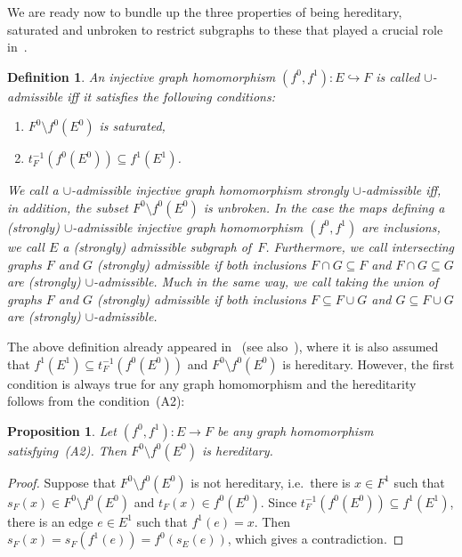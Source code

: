 \documentclass[12pt,times,a4paper]{amsart}
\newtheorem{proposition}[theorem]{Proposition}
\newtheorem{definition}[theorem]{Definition}
\numberwithin{equation}{section}
\numberwithin{equation}{section}
\begin{document}
We are ready now to bundle up the three properties of being hereditary, saturated and unbroken
to restrict subgraphs to these that played a crucial role in~\cite{hrt20}.
\begin{definition}\label{admissiblesubgraph}
An injective graph homomorphism $(f^0,f^1):E\hookrightarrow F$ is called $\cup$-{\em admissible} iff
 it satisfies the following conditions:
\begin{enumerate}
\item[{\rm (A1)}] $F^0\setminus f^0(E^0)$ is saturated,
\item[{\rm (A2)}] $t^{-1}_F(f^0(E^0))\subseteq f^1(E^1)$.
\end{enumerate}
We call a $\cup$-admissible injective graph homomorphism
 \emph{strongly $\cup$-admissible} iff, in addition, the subset $F^0\setminus f^0(E^0)$ is unbroken.
In the case the maps defining a (strongly) $\cup$-admissible injective graph homomorphism $(f^0,f^1)$ are inclusions, 
we call $E$ a {\em (strongly) admissible subgraph} of~$F$.
Furthermore, we call intersecting  graphs $F$ and $G$ (strongly) admissible if both inclusions $F\cap G\subseteq F$ 
and $F\cap G\subseteq G$ are (strongly) $\cup$-admissible. Much in the same way, we call taking the union of graphs $F$ and $G$ 
(strongly) admissible if both inclusions $F\subseteq F\cup G$ 
and $G\subseteq F\cup G$ are (strongly) $\cup$-admissible. 
\end{definition}
\noindent
The above definition already appeared in~\cite[Definition~3.1]{cht21} (see also~\cite[Definition~2.1]{hrt20}), where it is also 
assumed that $f^1(E^1)\subseteq t^{-1}_F(f^0(E^0))$ and $F^0\setminus f^0(E^0)$ is hereditary. However, the 
first condition is always true for any graph homomorphism and the hereditarity follows from 
the condition~(A2):
\begin{proposition}\label{hermorph}
Let $(f^0,f^1):E\to F$ be any graph homomorphism satisfying~(A2). Then $F^0\setminus f^0(E^0)$ is hereditary.
\end{proposition}
\begin{proof}
Suppose that $F^0\setminus f^0(E^0)$ is not hereditary, i.e.\ there is $x\in F^1$ such that $s_F(x)\in F^0\setminus f^0(E^0)$ and 
$t_F(x)\in f^0(E^0)$. Since $t_F^{-1}(f^0(E^0))\subseteq f^1(E^1)$, there is an edge $e\in E^1$ such that $f^1(e)=x$. 
Then $s_F(x)=s_F(f^1(e))=f^0(s_E(e))$, which gives a contradiction.
\end{proof}
\end{document}

